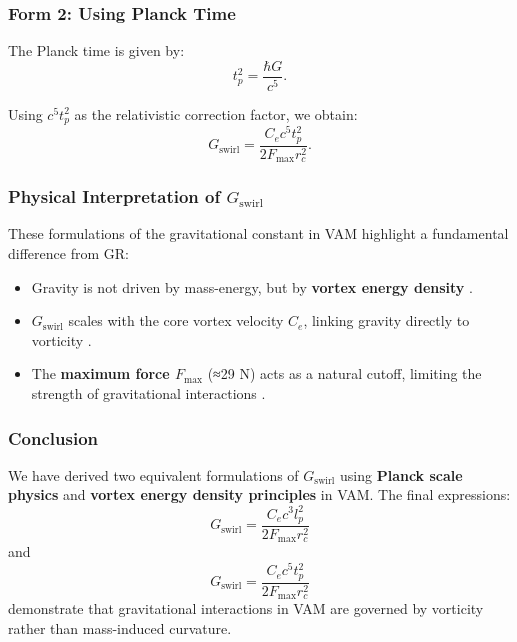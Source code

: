 \subsubsection*{Form 2: Using Planck Time}
The Planck time is given by:
\begin{equation*}
    t_p^2 = \frac{\hbar G}{c^5}.
\end{equation*}

Using \( c^5 t_p^2 \) as the relativistic correction factor, we obtain:
\begin{equation*}
     G_\text{swirl} = \frac{C_e c^5 t_p^2}{2 F_{\max} r_c^2}.
\end{equation*}

\subsubsection*{Physical Interpretation of \(  G_\text{swirl} \)}
These formulations of the gravitational constant in VAM highlight a fundamental difference from GR:
\begin{itemize}
    \item Gravity is not driven by mass-energy, but by \textbf{vortex energy density} \cite{barcelo_superfluid}.
    \item \(  G_\text{swirl} \) scales with the core vortex velocity \( C_e \), linking gravity directly to vorticity \cite{moffatt_helicity}.
    \item The \textbf{maximum force \( F_{\max} \)} (≈29 N) acts as a natural cutoff, limiting the strength of gravitational interactions \cite{schiller_max_force}.
\end{itemize}

\subsubsection*{Conclusion}
We have derived two equivalent formulations of \(  G_\text{swirl} \) using \textbf{Planck scale physics} and \textbf{vortex energy density principles} in VAM. The final expressions:
\begin{equation*}
     G_\text{swirl} = \frac{C_e c^3 l_p^2}{2 F_{\max} r_c^2}
\end{equation*}
and
\begin{equation*}
     G_\text{swirl} = \frac{C_e c^5 t_p^2}{2 F_{\max} r_c^2}
\end{equation*}
demonstrate that gravitational interactions in VAM are governed by vorticity rather than mass-induced curvature.

